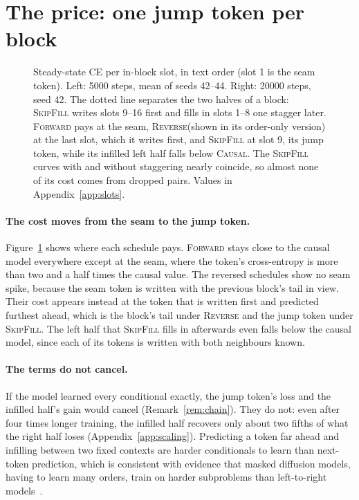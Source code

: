 \documentclass{article}
\theoremstyle{definition}
\theoremstyle{remark}
\newcommand{\name}[1]{\textup{\textsc{#1}}}
\newcommand{\sfill}{\name{SkipFill}\xspace}
\newcommand{\rev}{\name{Reverse}\xspace}
\newcommand{\fwd}{\name{Forward}\xspace}
\newcommand{\causal}{\name{Causal}\xspace}
\begin{document}
\section{The price: one jump token per block}
\label{sec:price}

\begin{figure}[t]
  \centering
  
  \caption{Steady-state CE per in-block slot, in text order (slot 1 is the seam token). Left: 5000 steps, mean of seeds 42--44. Right: 20000 steps, seed 42. The dotted line separates the two halves of a block: \sfill writes slots 9--16 first and fills in slots 1--8 one stagger later. \fwd pays at the seam, \rev (shown in its order-only version) at the last slot, which it writes first, and \sfill at slot 9, its jump token, while its infilled left half falls below \causal. The \sfill curves with and without staggering nearly coincide, so almost none of its cost comes from dropped pairs. Values in Appendix~\ref{app:slots}.}
  \label{fig:slots}
\end{figure}

\paragraph{The cost moves from the seam to the jump token.}
Figure~\ref{fig:slots} shows where each schedule pays.
\fwd stays close to the causal model everywhere except at the seam, where the token's cross-entropy is more than two and a half times the causal value.
The reversed schedules show no seam spike, because the seam token is written with the previous block's tail in view.
Their cost appears instead at the token that is written first and predicted furthest ahead, which is the block's tail under \rev and the jump token under \sfill.
The left half that \sfill fills in afterwards even falls below the causal model, since each of its tokens is written with both neighbours known.

\paragraph{The terms do not cancel.}
If the model learned every conditional exactly, the jump token's loss and the infilled half's gain would cancel (Remark~\ref{rem:chain}).
They do not: even after four times longer training, the infilled half recovers only about two fifths of what the right half loses (Appendix~\ref{app:scaling}).
Predicting a token far ahead and infilling between two fixed contexts are harder conditionals to learn than next-token prediction, which is consistent with evidence that masked diffusion models, having to learn many orders, train on harder subproblems than left-to-right models~\citep{kim2025trainworst}.
\end{document}
